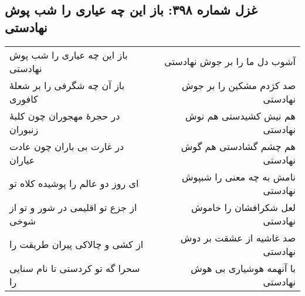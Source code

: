\begin{center}
\section*{غزل شماره ۳۹۸: باز این چه عیاری را شب پوش نهادستی}
\label{sec:398}
\begin{longtable}{l p{0.5cm} r}
باز این چه عیاری را شب پوش نهادستی
&&
آشوب دل ما را بر جوش نهادستی
\\
باز آن چه شگرفی را بر شعلهٔ کافوری
&&
صد کژدم مشکین را بر جوش نهادستی
\\
در حجرهٔ مهجوران چون کلبهٔ زنبوران
&&
هم نیش کشیدستی هم نوش نهادستی
\\
در غارت بی باران چون عادت عیاران
&&
هم چشم گشادستی هم گوش نهادستی
\\
ای روز دو عالم را پوشیده کلاه تو
&&
نامش به چه معنی را شبپوش نهادستی
\\
از جزع تو اقلیمی در شور و تو از شوخی
&&
لعل شکرافشان را خاموش نهادستی
\\
از کشی و چالاکی پیران طریقت را
&&
صد غاشیه از عشقت بر دوش نهادستی
\\
سحرا گه تو کردستی تا نام سنایی را
&&
با آنهمه هوشیاری بی هوش نهادستی
\\
\end{longtable}
\end{center}
